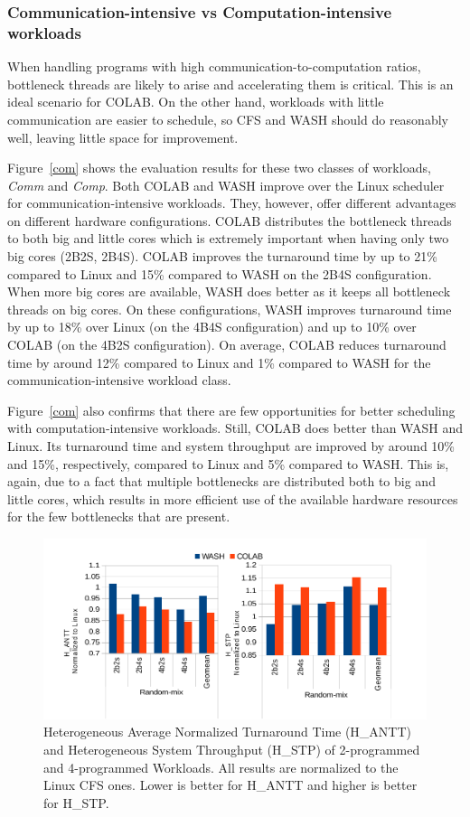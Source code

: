 \subsubsection{Communication-intensive vs Computation-intensive workloads}
When handling programs with high communication-to-computation ratios, bottleneck threads are likely to arise and accelerating them is critical. This is an ideal scenario for COLAB. On the other hand, workloads with little communication are easier to schedule, so CFS and WASH should do reasonably well, leaving little space for improvement.

Figure~\ref{com} shows the evaluation results for these two classes of workloads, \emph{Comm} and \emph{Comp}. Both COLAB and WASH improve over the Linux scheduler for communication-intensive workloads. They, however, offer different advantages on different hardware configurations. COLAB distributes the bottleneck threads to both big and little cores which is extremely important when having only two big cores (2B2S, 2B4S). COLAB improves the turnaround time by up to 21\% compared to Linux and 15\% compared to WASH on the 2B4S configuration. When more big cores are available, WASH does better as it keeps all bottleneck threads on big cores. On these configurations, WASH improves turnaround time by up to 18\% over Linux (on the 4B4S configuration) and up to 10\% over COLAB (on the 4B2S configuration). On average, COLAB reduces turnaround time by around 12\% compared to Linux and 1\% compared to WASH for the communication-intensive workload class.

Figure~\ref{com} also confirms that there are few opportunities for better scheduling with computation-intensive workloads. Still, COLAB does better than WASH and Linux. Its turnaround time and system throughput are improved by around 10\% and 15\%, respectively, compared to Linux and 5\% compared to WASH. This is, again, due to a fact that multiple bottlenecks are distributed both to big and little cores, which results in more efficient use of the available hardware resources for the few bottlenecks that are present.

\begin{figure}
\centering
\includegraphics[scale=0.57]{figures/rand.pdf}
\caption{Heterogeneous Average Normalized Turnaround Time (H\_ANTT) and Heterogeneous System Throughput (H\_STP) of 2-programmed and 4-programmed Workloads. All results are normalized to the Linux CFS ones. Lower is better for H\_ANTT and higher is better for H\_STP.}
\label{rand}
\end{figure} 

